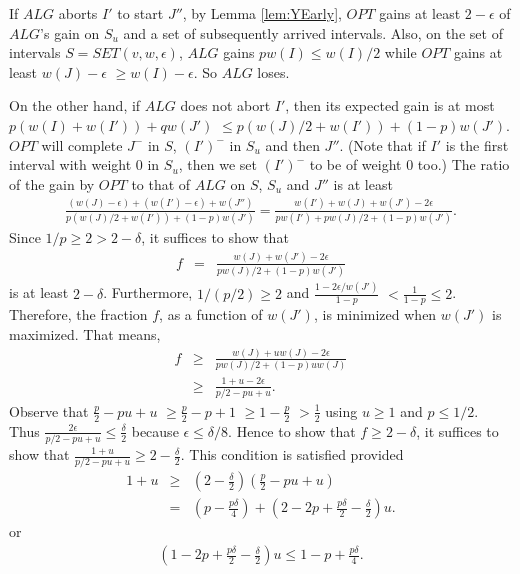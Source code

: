\documentclass[11pt]{article}
\begin{document}
If $ALG$ aborts $I'$ to start $J''$,
by Lemma \ref{lem:YEarly}, $OPT$ gains at least
$2-\epsilon$ of $ALG$'s gain on $S_u$ and a set of subsequently
arrived intervals.
Also, on the set of intervals $S = SET(v,w,\epsilon)$,
$ALG$ gains $pw(I) \leq w(I)/2$ while $OPT$ gains at least 
$w(J) - \epsilon$ $\geq w(I) -\epsilon$.
So $ALG$ loses.

On the other hand, if $ALG$ does not abort $I'$,
then its expected gain is at most $p(w(I)+w(I')) + qw(J')$
$\leq p(w(J)/2 + w(I')) + (1-p)w(J')$.
$OPT$ will complete $J^-$ in $S$,
$(I')^-$ in $S_u$ and then $J''$.
(Note that if $I'$ is the first interval with weight 0
in $S_u$, then we set $(I')^-$ to be of weight 0 too.)
The ratio of the gain by $OPT$ to that of $ALG$ 
on $S$, $S_u$ and $J''$ is at least
\begin{eqnarray*}
\frac{(w(J)-\epsilon) + (w(I')-\epsilon) + w(J'')}
     {p(w(J)/2 + w(I')) + (1-p)w(J')} 
    =   \frac{w(I') + w(J) + w(J') - 2\epsilon}
               {pw(I') + pw(J)/2 + (1-p) w(J')}.
\end{eqnarray*}
Since $1/p \ge 2 > 2-\delta$, it suffices to show that
\begin{eqnarray*}
f & = & \frac{w(J) + w(J') -2\epsilon}
             {pw(J)/2 + (1-p) w(J')} 
\end{eqnarray*}
is at least $2-\delta$.
Furthermore, $1/(p/2) \geq 2$ and
$\frac{1- 2\epsilon/w(J')}{1-p}$ $< \frac{1}{1-p} \leq 2$.
Therefore, the fraction $f$, as a function of $w(J')$,
is minimized when $w(J')$ is maximized.
That means,
\begin{eqnarray*}
f & \geq & \frac{w(J) + uw(J) - 2\epsilon}
                {pw(J)/2 + (1-p) uw(J)}   \\
  & \geq & \frac{1 + u -2\epsilon}
                {p/2 - pu + u}.
\end{eqnarray*}
Observe that $\frac{p}{2} - pu + u$
$\geq \frac{p}{2} - p + 1$
$\geq 1 - \frac{p}{2}$ $> \frac{1}{2}$
using $u \geq 1$ and $p \leq 1/2$.
Thus $\frac{2\epsilon}{p/2 - pu + u} \leq \frac{\delta}{2}$
because $\epsilon \leq \delta/8$.
Hence to show that $f \geq 2-\delta$, it suffices to
show that $\frac{1+u}{p/2 - pu + u} \geq 2-\frac{\delta}{2}$.
This condition is satisfied provided
\begin{eqnarray*}
1 + u
  & \geq & (2-\frac{\delta}{2}) (\frac{p}{2} - pu + u) \\
  &  =   & (p - \frac{p\delta}{4}) 
              + (2 - 2p + \frac{p\delta}{2} - \frac{\delta}{2}) u.
\end{eqnarray*}
or
\begin{eqnarray*}
(1 - 2p + \frac{p\delta}{2} - \frac{\delta}{2}) u 
   \leq 1 - p + \frac{p\delta}{4}.
\end{eqnarray*}
\end{document}
